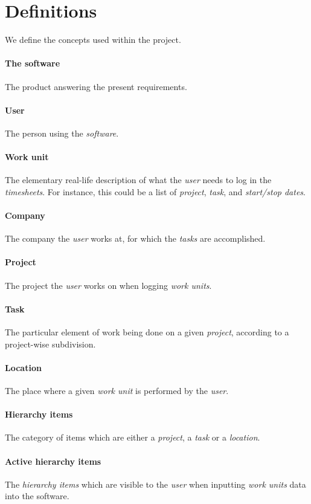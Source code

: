 \section{Definitions}
We define the concepts used within the project.

\paragraph{The software} The product answering the present requirements.
\paragraph{User} The person using the \emph{software}.
\paragraph{Work unit} The elementary real-life description of what the
  \emph{user} needs to log in the \emph{timesheets}. For instance, this could be
  a list of \emph{project}, \emph{task}, and \emph{start/stop dates}.
\paragraph{Company} The company the \emph{user} works at, for which the
  \emph{tasks} are accomplished.
\paragraph{Project} The project the \emph{user} works on when logging
  \emph{work units}.
\paragraph{Task} The particular element of work being done on a given
  \emph{project}, according to a project-wise subdivision.
\paragraph{Location} The place where a given \emph{work unit} is performed
  by the \emph{user}.
\paragraph{Hierarchy items} The category of items which are either a
  \emph{project}, a \emph{task} or a \emph{location}.
\paragraph{Active hierarchy items} The \emph{hierarchy items} which are
  visible to the \emph{user} when inputting \emph{work units} data into the
  software.

